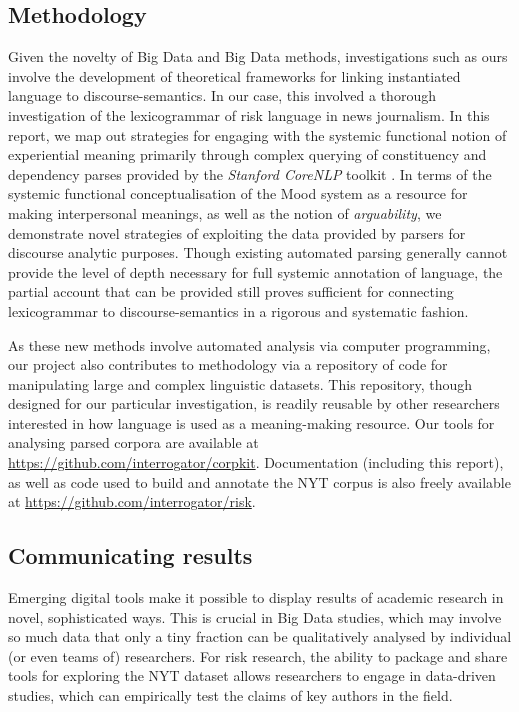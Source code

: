 \subsection{Methodology}

Given the novelty of Big Data and Big Data methods, investigations such as ours involve the development of theoretical frameworks for linking instantiated language to discourse-semantics. In our case, this involved a thorough investigation of the lexicogrammar of risk language in news journalism. In this report, we map out strategies for engaging with the systemic functional notion of experiential meaning primarily through complex querying of constituency and dependency parses provided by the \emph{Stanford CoreNLP} toolkit \cite{manning_stanford_2014}. In terms of the systemic functional conceptualisation of the Mood system as a resource for making interpersonal meanings, as well as the notion of \emph{arguability}, we demonstrate novel strategies of exploiting the data provided by parsers for discourse analytic purposes. Though existing automated parsing generally cannot provide the level of depth necessary for full systemic annotation of language, the partial account that can be provided still proves sufficient for connecting lexicogrammar to discourse-semantics in a rigorous and systematic fashion.

As these new methods involve automated analysis via computer programming, our project also contributes to methodology via a repository of code for manipulating large and complex linguistic datasets. This repository, though designed for our particular investigation, is readily reusable by other researchers interested in how language is used as a meaning-making resource. Our tools for analysing parsed corpora are available at \url{https://github.com/interrogator/corpkit}. Documentation (including this report), as well as code used to build and annotate the NYT corpus is also freely available at \url{https://github.com/interrogator/risk}.

\subsection{Communicating results}

Emerging digital tools make it possible to display results of academic research in novel, sophisticated ways. This is crucial in Big Data studies, which may involve so much data that only a tiny fraction can be qualitatively analysed by individual (or even teams of) researchers. For risk research, the ability to package and share tools for exploring the NYT dataset allows researchers to engage in data-driven studies, which can empirically test the claims of key authors in the field.


